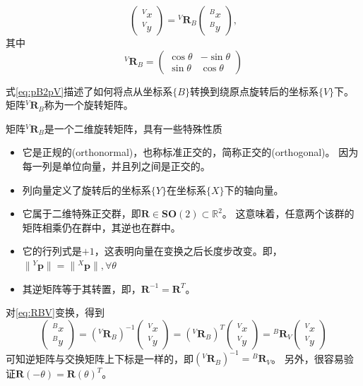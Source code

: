 \documentclass[UTF8,a4paper,10pt]{ctexart}
\begin{document}
\begin{equation}\label{eq:pB2pV}
  \begin{pmatrix}{}^Vx\\{}^Vy\end{pmatrix}=
  {}^V\mathbf{R}_B\begin{pmatrix}{}^Bx\\{}^By\end{pmatrix},
\end{equation}
其中
\begin{equation}\label{eq:RBV}
  {}^V\mathbf{R}_B=
  \begin{pmatrix}\cos\theta  & -\sin\theta\\\sin\theta & \cos\theta\end{pmatrix}
\end{equation}

式\eqref{eq:pB2pV}描述了如何将点从坐标系$\{B\}$转换到绕原点旋转后的坐标系$\{V\}$下。
矩阵${}^V\mathbf{R}_B$称为一个旋转矩阵。

矩阵${}^V\mathbf{R}_B$是一个二维旋转矩阵，具有一些特殊性质
\begin{itemize}
\item 它是正规的(orthonormal)，也称标准正交的，简称正交的(orthogonal)。
  因为每一列是单位向量，并且列之间是正交的。
\item 列向量定义了旋转后的坐标系$\{Y\}$在坐标系$\{X\}$下的轴向量。
\item 它属于二维特殊正交群，即$\mathbf{R}\in\mathbf{SO}(2)\subset\mathbb{R}^2$。
  这意味着，任意两个该群的矩阵相乘仍在群中，其逆也在群中。
\item 它的行列式是$+1$，这表明向量在变换之后长度步改变。即，$\|{}^Y\mathbf{p}\|=\|{}^X\mathbf{p}\|, \forall\theta$
\item 其逆矩阵等于其转置，即，$\mathbf{R}^{-1}=\mathbf{R}^{T}$。
\end{itemize}

对\eqref{eq:RBV}变换，得到
\begin{equation*}
  \begin{pmatrix}{}^Bx\\{}^By\end{pmatrix}=
  \left({}^V\mathbf{R}_B\right)^{-1}\begin{pmatrix}{}^Vx\\{}^Vy\end{pmatrix}=
  \left({}^V\mathbf{R}_B\right)^{T}\begin{pmatrix}{}^Vx\\{}^Vy\end{pmatrix}=
  {}^B\mathbf{R}_V\begin{pmatrix}{}^Vx\\{}^Vy\end{pmatrix}
\end{equation*}
可知逆矩阵与交换矩阵上下标是一样的，即$\left({}^V\mathbf{R}_B\right)^{-1}={}^B\mathbf{R}_V$。
另外，很容易验证$\mathbf{R}(-\theta)=\mathbf{R}(\theta)^T$。
\end{document}
